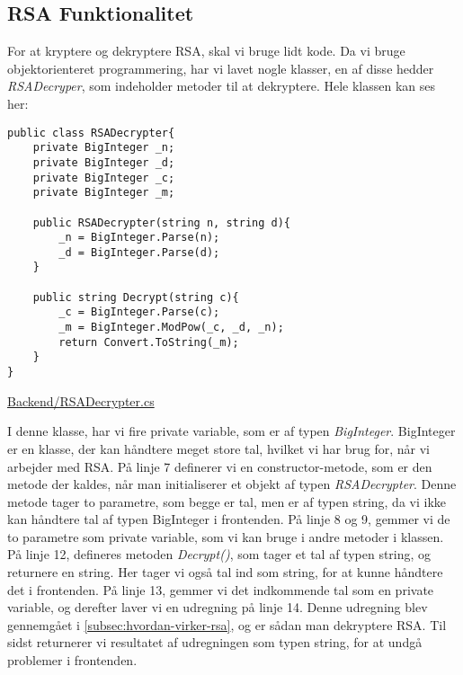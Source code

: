 \documentclass[a4paper,12pt]{extarticle}
\begin{document}
    \subsection{RSA Funktionalitet}\label{subsec:rsa-functionality}
    For at kryptere og dekryptere RSA, skal vi bruge lidt kode.
    Da vi bruge objektorienteret programmering, har vi lavet nogle klasser, en af disse hedder \emph{RSADecryper},
    som indeholder metoder til at dekryptere.
    Hele klassen kan ses her:
    \begin{listing}[!ht]
        \begin{verbatim}
public class RSADecrypter{
    private BigInteger _n;
    private BigInteger _d;
    private BigInteger _c;
    private BigInteger _m;
    
    public RSADecrypter(string n, string d){
        _n = BigInteger.Parse(n);
        _d = BigInteger.Parse(d);
    }
    
    public string Decrypt(string c){
        _c = BigInteger.Parse(c);
        _m = BigInteger.ModPow(_c, _d, _n);
        return Convert.ToString(_m);
    }
}
        \end{verbatim}
        \caption{\protect\href{https://github.com/Zymat-dk/RSACrackstation/blob/main/Backend/RSADecrypter.cs}{Backend/RSADecrypter.cs}}
    \end{listing}

    I denne klasse, har vi fire private variable, som er af typen \emph{BigInteger}.
    BigInteger er en klasse, der kan håndtere meget store tal, hvilket vi har brug for, når vi arbejder med RSA.\@
    På linje 7 definerer vi en constructor-metode, som er den metode der kaldes,
    når man initialiserer et objekt af typen \emph{RSADecrypter}.
    Denne metode tager to parametre, som begge er tal, men er af typen string,
    da vi ikke kan håndtere tal af typen BigInteger i frontenden.
    På linje 8 og 9, gemmer vi de to parametre som private variable, som vi kan bruge i andre metoder i klassen.\@
    På linje 12, defineres metoden \emph{Decrypt()}, som tager et tal af typen string, og returnere en string.
    Her tager vi også tal ind som string, for at kunne håndtere det i frontenden.
    På linje 13, gemmer vi det indkommende tal som en private variable, og derefter laver vi en udregning på linje 14.
    Denne udregning blev gennemgået i \autoref{subsec:hvordan-virker-rsa}, og er sådan man dekryptere RSA.\@
    Til sidst returnerer vi resultatet af udregningen som typen string, for at undgå problemer i frontenden.\@
\end{document}
